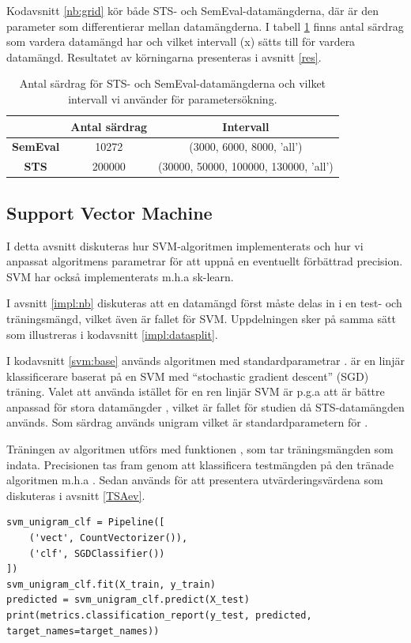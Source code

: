 \documentclass{kaumasters} %
\begin{document}
Kodavsnitt \ref{nb:grid} kör både STS- och SemEval-datamängderna, där  är den parameter som differentierar mellan datamängderna.  I tabell \ref{tab:kbest} finns antal särdrag som vardera datamängd har och vilket intervall (x) sätts till för vardera datamängd. Resultatet av körningarna presenteras i avsnitt \ref{res}.

\begin{table}
\centering
\caption{Antal särdrag för STS- och SemEval-datamängderna och vilket intervall vi använder för parametersökning.}
\label{tab:kbest}
    \begin{tabular}{ccc}
    \toprule
     & \textbf{Antal särdrag} & \textbf{Intervall} \\
    \midrule
    \textbf{SemEval} & 10272 & (3000, 6000, 8000, 'all') \\ 
    \textbf{STS} & 200000 & (30000, 50000, 100000, 130000, 'all') \\
    \bottomrule
\end{tabular}
\end{table}




\subsection{Support Vector Machine}\label{impl:svm}
I detta avsnitt diskuteras hur SVM-algoritmen implementerats och hur vi anpassat algoritmens parametrar för att uppnå en eventuellt förbättrad precision. SVM har också implementerats m.h.a sk-learn.

I avsnitt \ref{impl:nb} diskuteras att en datamängd först måste delas in i en test- och träningsmängd, vilket även är fallet för SVM. Uppdelningen sker på samma sätt som illustreras i kodavsnitt \ref{impl:datasplit}. 

I kodavsnitt \ref{svm:base} används algoritmen  med standardparametrar \cite{scikit:009}.  är en linjär klassificerare baserat på en SVM med “stochastic gradient descent” (SGD) träning. Valet att använda  istället för en ren linjär SVM är p.g.a att  är bättre anpassad för stora datamängder \cite{scikit:008}, vilket är fallet för studien då STS-datamängden används. Som särdrag används unigram vilket är standardparametern för .

Träningen av algoritmen utförs med funktionen , som tar träningsmängden som indata. Precisionen tas fram genom att klassificera testmängden på den tränade algoritmen m.h.a . Sedan används  för att presentera utvärderingsvärdena som diskuteras i avsnitt \ref{TSAev}.
\begin{lstlisting}[style=mypython,caption={Kod för att skapa och träna SVM-klassificeraren.},label=svm:base]
svm_unigram_clf = Pipeline([
	('vect', CountVectorizer()), 
	('clf', SGDClassifier())
])
svm_unigram_clf.fit(X_train, y_train)
predicted = svm_unigram_clf.predict(X_test)
print(metrics.classification_report(y_test, predicted, target_names=target_names))
\end{lstlisting}
\end{document}

